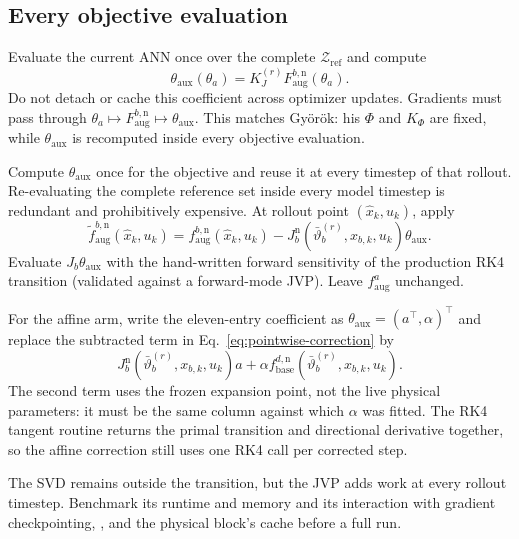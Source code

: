 \documentclass[11pt,a4paper]{article}
\begin{document}
\subsection{Every objective evaluation}

Evaluate the current ANN once over the complete \(\mathcal Z_{\mathrm{ref}}\)
and compute
\begin{equation}
    \theta_{\mathrm{aux}}(\theta_a)
    =K_J^{(r)}F_{\mathrm{aug}}^{b,\mathrm n}(\theta_a).
    \label{eq:coefficient-per-objective}
\end{equation}
Do not detach or cache this coefficient across optimizer updates. Gradients
must pass through
\(\theta_a\mapsto F_{\mathrm{aug}}^{b,\mathrm n}\mapsto
\theta_{\mathrm{aux}}\). This matches Gy\"or\"ok: his \(\Phi\) and
\(K_\Phi\) are fixed, while \(\theta_{\mathrm{aux}}\) is recomputed inside
every objective evaluation.

Compute \(\theta_{\mathrm{aux}}\) once for the objective and reuse it at every
timestep of that rollout. Re-evaluating the complete reference set inside
every model timestep is redundant and prohibitively expensive. At rollout
point \((\hat x_k,u_k)\), apply
\begin{equation}
    \widetilde f_{\mathrm{aug}}^{b,\mathrm n}(\hat x_k,u_k)
    =f_{\mathrm{aug}}^{b,\mathrm n}(\hat x_k,u_k)
     -J_b^{\mathrm n}(\bar\vartheta_b^{(r)},x_{b,k},u_k)
      \theta_{\mathrm{aux}}.
    \label{eq:pointwise-correction}
\end{equation}
Evaluate \(J_b\theta_{\mathrm{aux}}\) with the hand-written forward
sensitivity of the production RK4 transition (validated against a
forward-mode JVP). Leave \(f_{\mathrm{aug}}^a\) unchanged.

For the affine arm, write the eleven-entry coefficient as
\(\theta_{\mathrm{aux}}=(a^\top,\alpha)^\top\) and replace the subtracted
term in Eq.~\eqref{eq:pointwise-correction} by
\begin{equation}
 J_b^{\mathrm n}(\bar\vartheta_b^{(r)},x_{b,k},u_k)a
 +\alpha f_{\mathrm{base}}^{d,\mathrm n}
   (\bar\vartheta_b^{(r)},x_{b,k},u_k).
 \label{eq:affine-pointwise-correction}
\end{equation}
The second term uses the frozen expansion point, not the live physical
parameters: it must be the same column against which \(\alpha\) was fitted.
The RK4 tangent routine returns the primal transition and directional
derivative together, so the affine correction still uses one RK4 call per
corrected step.

The SVD remains outside the transition, but the JVP adds work at every rollout
timestep. Benchmark its runtime and memory and its interaction with gradient
checkpointing, , and the physical block's 
cache before a full run.
\end{document}

